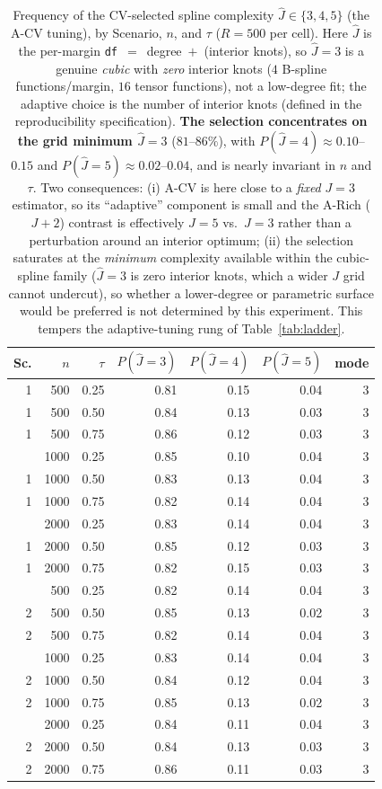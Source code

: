 \begin{table}[t]\centering\small
\caption{Frequency of the CV-selected spline complexity $\widehat J\in\{3,4,5\}$ (the A-CV tuning), by Scenario, $n$, and $\tau$ ($R=500$ per cell). Here $\widehat J$ is the per-margin \texttt{df}~$=$~degree~$+$~(interior knots), so $\widehat J{=}3$ is a genuine \emph{cubic} with \emph{zero} interior knots ($4$ B-spline functions/margin, $16$ tensor functions), not a low-degree fit; the adaptive choice is the number of interior knots (defined in the reproducibility specification). \textbf{The selection concentrates on the grid minimum $\widehat J=3$} ($81$--$86\%$), with $P(\widehat J{=}4)\approx0.10$--$0.15$ and $P(\widehat J{=}5)\approx0.02$--$0.04$, and is nearly invariant in $n$ and $\tau$. Two consequences: (i) A-CV is here close to a \emph{fixed} $J{=}3$ estimator, so its ``adaptive'' component is small and the A-Rich ($J{+}2$) contrast is effectively $J{=}5$ vs.\ $J{=}3$ rather than a perturbation around an interior optimum; (ii) the selection saturates at the \emph{minimum} complexity available within the cubic-spline family ($\widehat J{=}3$ is zero interior knots, which a wider $J$ grid cannot undercut), so whether a lower-degree or parametric surface would be preferred is not determined by this experiment. This tempers the adaptive-tuning rung of Table~\ref{tab:ladder}.}
\label{tab:cvfreq}\begin{tabular}{rrr rrr r}\toprule
Sc.&$n$&$\tau$&$P(\widehat J{=}3)$&$P(\widehat J{=}4)$&$P(\widehat J{=}5)$&mode\\\midrule
1 & 500 & 0.25 & 0.81 & 0.15 & 0.04 & 3 \\
1 & 500 & 0.50 & 0.84 & 0.13 & 0.03 & 3 \\
1 & 500 & 0.75 & 0.86 & 0.12 & 0.03 & 3 \\
\addlinespace
1 & 1000 & 0.25 & 0.85 & 0.10 & 0.04 & 3 \\
1 & 1000 & 0.50 & 0.83 & 0.13 & 0.04 & 3 \\
1 & 1000 & 0.75 & 0.82 & 0.14 & 0.04 & 3 \\
\addlinespace
1 & 2000 & 0.25 & 0.83 & 0.14 & 0.04 & 3 \\
1 & 2000 & 0.50 & 0.85 & 0.12 & 0.03 & 3 \\
1 & 2000 & 0.75 & 0.82 & 0.15 & 0.03 & 3 \\
\addlinespace
2 & 500 & 0.25 & 0.82 & 0.14 & 0.04 & 3 \\
2 & 500 & 0.50 & 0.85 & 0.13 & 0.02 & 3 \\
2 & 500 & 0.75 & 0.82 & 0.14 & 0.04 & 3 \\
\addlinespace
2 & 1000 & 0.25 & 0.83 & 0.14 & 0.04 & 3 \\
2 & 1000 & 0.50 & 0.84 & 0.12 & 0.04 & 3 \\
2 & 1000 & 0.75 & 0.85 & 0.13 & 0.02 & 3 \\
\addlinespace
2 & 2000 & 0.25 & 0.84 & 0.11 & 0.04 & 3 \\
2 & 2000 & 0.50 & 0.84 & 0.13 & 0.03 & 3 \\
2 & 2000 & 0.75 & 0.86 & 0.11 & 0.03 & 3 \\
\bottomrule\end{tabular}\end{table}

